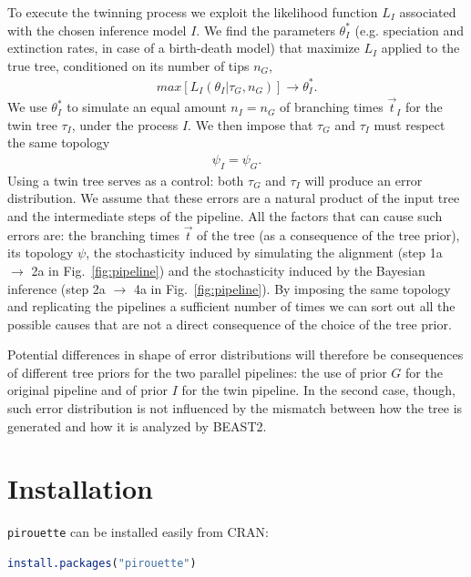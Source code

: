 \documentclass{article}
\begin{document}
To execute the twinning process we exploit the likelihood function $L_{I}$ associated with the chosen inference model $\mathit{I}$. We find the parameters $\theta^{*}_{I}$ (e.g. speciation and extinction rates, in case of a birth-death model) that maximize $L_{I}$ applied to the true tree, conditioned on its number of tips $n_{G}$,
\begin{align}
    max[L_{I}(\theta_{I}|\tau_{G}, n_{G})] \rightarrow \theta^{*}_{I}.
\end{align}
We use $\theta^{*}_{I}$ to simulate an equal amount $n_{I} = n_{G}$ of branching times $\Vec{t}_{I}$ for the twin tree $\tau_{I}$, under the process $I$. We then impose that $\tau_{G}$ and $\tau_{I}$ must respect the same topology
\begin{align}
    \psi_{I} = \psi_{G}.
\end{align}
Using a twin tree serves as a control: both $\tau_{G}$ and $\tau_{I}$ will produce an error distribution. We assume that these errors are a natural product of the input tree and the intermediate steps of the pipeline. All the factors that can cause such errors are: the branching times $\vec{t}$ of the tree (as a consequence of the tree prior), its topology $\psi$, the stochasticity induced by simulating the alignment (step 1a $\rightarrow$ 2a in Fig.~\ref{fig:pipeline}) and the stochasticity induced by the Bayesian inference (step 2a $\rightarrow$ 4a in Fig.~\ref{fig:pipeline}). By imposing the same topology and replicating the pipelines a sufficient number of times we can sort out all the possible causes that are not a direct consequence of the choice of the tree prior.

Potential differences in shape of error distributions will therefore be consequences of different tree priors for the two parallel pipelines: the use of prior $\mathit{G}$ for the original pipeline and of prior $\mathit{I}$ for the twin pipeline. In the second case, though, such error distribution is not influenced by the mismatch between how the tree is generated and how it is analyzed by BEAST2.
\section{Installation}

\verb;pirouette; can be installed easily from CRAN:
\begin{lstlisting}[language=R, floatplacement=ht, frame=single]
install.packages("pirouette")
\end{lstlisting}
\end{document}
